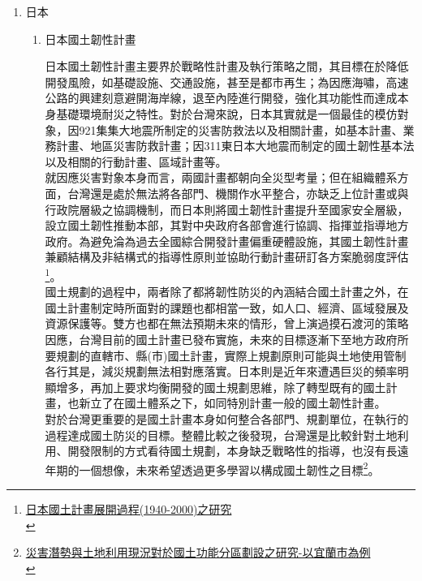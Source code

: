 \documentclass[a4paper,12pt]{article}
\begin{document}
\begin{enumerate}
\item 日本
\label{sec:org3737f13}

\begin{enumerate}
\item 日本國土韌性計畫
\label{sec:org0e01f32}

日本國土韌性計畫主要界於戰略性計畫及執行策略之間，其目標在於降低開發風險，如基礎設施、交通設施，甚至是都市再生；為因應海嘯，高速公路的興建刻意避開海岸線，退至內陸進行開發，強化其功能性而達成本身基礎環境耐災之特性。對於台灣來說，日本其實就是一個最佳的模仿對象，因921集集大地震所制定的災害防救法以及相關計畫，如基本計畫、業務計畫、地區災害防救計畫；因311東日本大地震而制定的國土韌性基本法以及相關的行動計畫、區域計畫等。\\

就因應災害對象本身而言，兩國計畫都朝向全災型考量；但在組織體系方面，台灣還是處於無法將各部門、機關作水平整合，亦缺乏上位計畫或與行政院層級之協調機制，而日本則將國土韌性計畫提升至國家安全層級，設立國土韌性推動本部，其對中央政府各部會進行協調、指揮並指導地方政府。為避免淪為過去全國綜合開發計畫偏重硬體設施，其國土韌性計畫兼顧結構及非結構式的指導性原則並協助行動計畫研訂各方案脆弱度評估\footnote{\href{https://www.google.com/url?sa=t\&rct=j\&q=\&esrc=s\&source=web\&cd=\&ved=2ahUKEwjB8anqhMPvAhXQEqYKHeduCgYQFjAAegQIBhAD\&url=http\%3A\%2F\%2Feportfolio.lib.ksu.edu.tw\%2Fuser\%2F4\%2F9\%2F4970T113\%2Frepository\%2FA2-2.pdf\&usg=AOvVaw2Q5Exe9XHwDJNSuRuVsXQD}{日本國土計畫展開過程(1940-2000)之研究}\\}。\\

國土規劃的過程中，兩者除了都將韌性防災的內涵結合國土計畫之外，在國土計畫制定時所面對的課題也都相當一致，如人口、經濟、區域發展及資源保護等。雙方也都在無法預期未來的情形，曾上演過摸石渡河的策略因應，台灣目前的國土計畫已發布實施，未來的目標逐漸下至地方政府所要規劃的直轄市、縣(市)國土計畫，實際上規劃原則可能與土地使用管制各行其是，減災規劃無法相對應落實。日本則是近年來遭遇巨災的頻率明顯增多，再加上要求均衡開發的國土規劃思維，除了轉型既有的國土計畫，也新立了在國土體系之下，如同特別計畫一般的國土韌性計畫。\\

對於台灣更重要的是國土計畫本身如何整合各部門、規劃單位，在執行的過程達成國土防災的目標。整體比較之後發現，台灣還是比較針對土地利用、開發限制的方式看待國土規劃，本身缺乏戰略性的指導，也沒有長遠年期的一個想像，未來希望透過更多學習以構成國土韌性之目標\footnote{\href{https://ndltd.ncl.edu.tw/cgi-bin/gs32/gsweb.cgi/login?o=dnclcdr\&s=id=\%22108MCU00653005\%22.\&searchmode=basic}{災害潛勢與土地利用現況對於國土功能分區劃設之研究-以宜蘭市為例}\\}。\\


\end{enumerate}
\end{enumerate}
\end{document}
